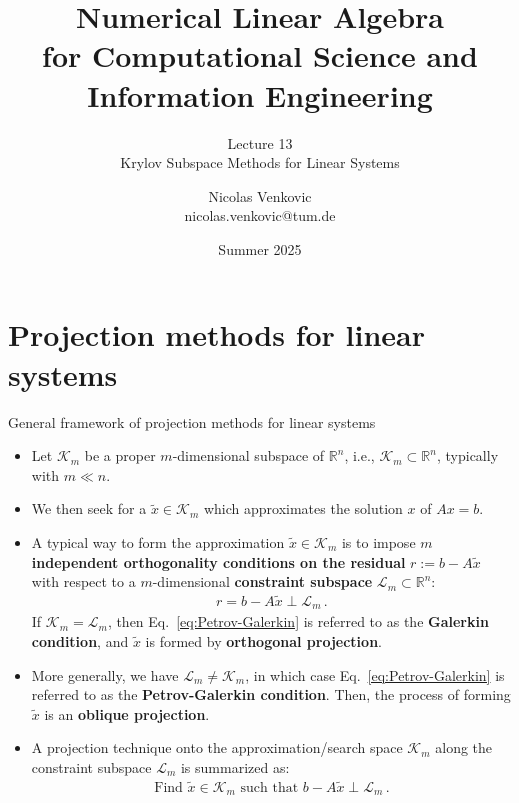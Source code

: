 \documentclass[t,usepdftitle=false]{beamer}
\title[NLA for CS and IE -- Lecture 13]{Numerical Linear Algebra\\for Computational Science and Information Engineering}
\subtitle{\vspace{.3cm}Lecture 13\\Krylov Subspace Methods for Linear Systems}
\date[Summer 2025]{Summer 2025}
\author[nicolas.venkovic@tum.de]{Nicolas Venkovic\\{\small nicolas.venkovic@tum.de}}
\institute[]{Group of Computational Mathematics\\School of Computation, Information and Technology\\Technical University of Munich}
\begin{document}
	
\begin{frame}
	\maketitle
\end{frame}
	
\myoutlineframe

\section{Projection methods for linear systems}

\begin{frame}{General framework of projection methods for linear systems}
\begin{itemize}
\item Let $\mathcal{K}_m$ be a proper $m$-dimensional subspace of $\mathbb{R}^n$, i.e., $\mathcal{K}_m\subset\mathbb{R}^n$, typically with $m\ll n$.
\item[] We then seek for a $\tilde{x}\in\mathcal{K}_m$ which approximates the solution $x$ of $Ax=b$.
\item[] A typical way to form the approximation $\boxed{\tilde{x}\in\mathcal{K}_m}$ is to impose $m$ \textbf{independent orthogonality conditions on the residual} $r:=b-A\tilde{x}$ with respect to a $m$-dimensional \textbf{constraint subspace} $\mathcal{L}_m\subset\mathbb{R}^n$:
\begin{align}\label{eq:Petrov-Galerkin}
\boxed{r=b-A\tilde{x}\perp\mathcal{L}_m}\,.
\end{align}
If $\mathcal{K}_m=\mathcal{L}_m$, then Eq.~\eqref{eq:Petrov-Galerkin} is referred to as the \textbf{Galerkin condition}, and $\tilde{x}$ is formed by \textbf{orthogonal projection}.
\item[] More generally, we have $\mathcal{L}_m\neq\mathcal{K}_m$, in which case Eq.~\eqref{eq:Petrov-Galerkin} is referred to as the \textbf{Petrov-Galerkin condition}.
Then, the process of forming $\tilde{x}$ is an \textbf{oblique projection}.
\item[] A projection technique onto the approximation/search space $\mathcal{K}_m$ along the constraint subspace $\mathcal{L}_m$ is summarized as:
\begin{align*}
\boxed{
\text{Find }\tilde{x}\in\mathcal{K}_m\text{ such that }b-A\tilde{x}\perp\mathcal{L}_m
}\,.
\end{align*}
\end{itemize}
\end{frame}
\end{document}
